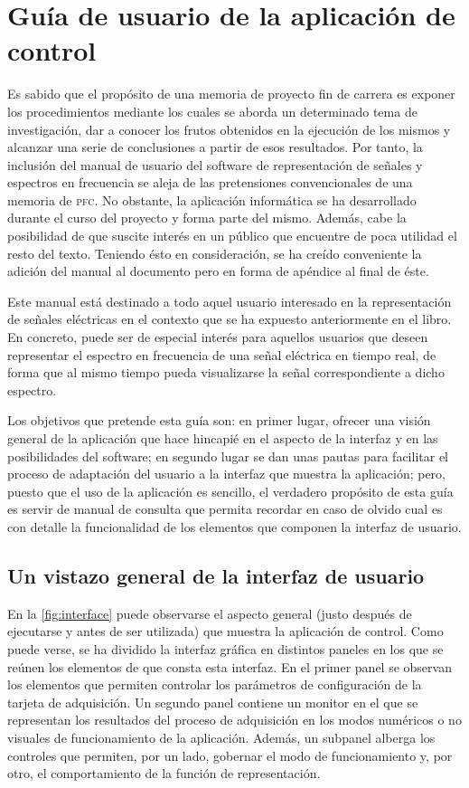 \chapter{Guía de usuario de la aplicación de control}\label{chap:appendixA}

Es sabido que el propósito de una memoria de proyecto fin de carrera es exponer los procedimientos mediante los cuales se aborda un determinado tema de investigación, dar a conocer los frutos obtenidos en la ejecución de los mismos y alcanzar una serie de conclusiones a partir de esos resultados. Por tanto, la inclusión del manual de usuario del software de representación de señales y espectros en frecuencia se aleja de las pretensiones convencionales de una memoria de \textsc{pfc}. No obstante, la aplicación informática se ha desarrollado durante el curso del proyecto y forma parte del mismo. Además, cabe la posibilidad de que suscite interés en un público que encuentre de poca utilidad el resto del texto. Teniendo ésto en consideración, se ha creído conveniente la adición del manual al documento pero en forma de apéndice al final de éste.\par
Este manual está destinado a todo aquel usuario interesado en la representación de señales eléctricas en el contexto que se ha expuesto anteriormente en el libro. En concreto, puede ser de especial interés para aquellos usuarios que deseen representar el espectro en frecuencia de una señal eléctrica en tiempo real, de forma que al mismo tiempo pueda visualizarse la señal correspondiente a dicho espectro.\par
Los objetivos que pretende esta guía son: en primer lugar, ofrecer una visión general de la aplicación que hace hincapié en el aspecto de la interfaz y en las posibilidades del software; en segundo lugar se dan unas pautas para facilitar el proceso de adaptación del usuario a la interfaz que muestra la aplicación; pero, puesto que el uso de la aplicación es sencillo, el verdadero propósito de esta guía es servir de manual de consulta que permita recordar en caso de olvido cual es con detalle la funcionalidad de los elementos que componen la interfaz de usuario.


\section{Un vistazo general de la interfaz de usuario}

En la \vref{fig:interface} puede observarse el aspecto general (justo después de ejecutarse y antes de ser utilizada) que muestra la aplicación de control. Como puede verse, se ha dividido la interfaz gráfica en distintos paneles en los que se reúnen los elementos de que consta esta interfaz. En el primer panel se observan los elementos que permiten controlar los parámetros de configuración de la tarjeta de adquisición. Un segundo panel contiene un monitor en el que se representan los resultados del proceso de adquisición en los modos numéricos o no visuales de funcionamiento de la aplicación. Además, un subpanel alberga los controles que permiten, por un lado, gobernar el modo de funcionamiento y, por otro, el comportamiento de la función de representación.

